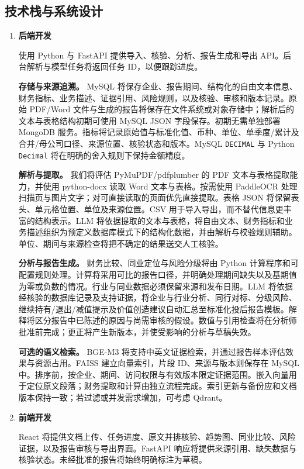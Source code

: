 \documentclass[a4paper,12pt]{article}
\begin{document}
\subsection{技术栈与系统设计}
\begin{enumerate}
  \item \textbf{后端开发}\par
  使用 Python 与 FastAPI 提供导入、核验、分析、报告生成和导出 API。后台解析与模型任务将返回任务 ID，以便跟踪进度。

  \noindent\textbf{存储与来源追溯。}
  MySQL 将保存企业、报告期间、结构化的自由文本信息、财务指标、业务描述、证据引用、风险规则，以及核验、审核和版本记录。原始 PDF/Word 文件与生成的报告将保存在文件系统或对象存储中；解析后的文本与表格结构初期可使用 MySQL JSON 字段保存。初期无需单独部署 MongoDB 服务。指标将记录原始值与标准化值、币种、单位、单季度/累计及合并/母公司口径、来源位置、核验状态和版本。MySQL \texttt{DECIMAL} 与 Python \texttt{Decimal} 将在明确的舍入规则下保持金额精度。

  \noindent\textbf{解析与提取。}
  我们将评估 PyMuPDF/pdfplumber 的 PDF 文本与表格提取能力，并使用 python-docx 读取 Word 文本与表格。按需使用 PaddleOCR 处理扫描页与图片文字；对可直接读取的页面优先直接提取。表格 JSON 将保留表头、单元格位置、单位及来源位置。CSV 用于导入导出，而不替代信息更丰富的结构表示。LLM 将依据提取的文本与表格，将自由文本、财务指标和业务描述组织为预定义数据库模式下的结构化数据，并由解析与校验规则辅助。单位、期间与来源检查将把不确定的结果送交人工核验。

  \noindent\textbf{分析与报告生成。}
  财务比较、同业定位与风险分级将由 Python 计算程序和可配置规则处理。计算将采用可比的报告口径，并明确处理期间缺失以及基期值为零或负数的情况。行业与同业数据必须保留来源和发布日期。LLM 将依据经核验的数据库记录及支持证据，将企业与行业分析、同行对标、分级风险、继续持有/退出/减值提示及价值创造建议自动汇总至标准化投后报告模板。解释将区分报告中已陈述的原因与尚需审核的假设。数值与引用检查将在分析师批准前完成；更正将产生新版本，并使受影响的分析与草稿失效。

  \noindent\textbf{可选的语义检索。}
  BGE-M3 将支持中英文证据检索，并通过报告样本评估效果与资源占用。FAISS 建立向量索引，片段 ID、来源与版本则保存在 MySQL 中。排序前，按企业、期间、访问权限与有效版本限定证据范围。嵌入向量用于定位原文段落；财务提取和计算由独立流程完成。索引更新与备份应和文档版本保持一致；若过滤或并发需求增加，可考虑 Qdrant。

  \item \textbf{前端开发}\par
  React 将提供文档上传、任务进度、原文并排核验、趋势图、同业比较、风险证据，以及报告审核与导出界面。FastAPI 响应将提供来源引用、缺失数据与核验状态。未经批准的报告将始终明确标注为草稿。
\end{enumerate}
\end{document}
